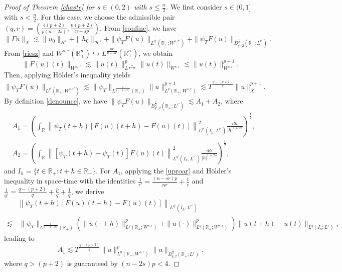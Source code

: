 \documentclass[preprint,compress,12pt]{elsarticle}
\numberwithin{equation}{section}
\begin{document}
\begin{proof}[Proof of Theorem \ref{chaste} for $s\in(0,2)$ with $s\leq \frac{n}{2}$]
	We first consider $s\in(0,1]$ with $s<\frac{n}{2}$. For this case, we choose the admissible pair
	$(q,r)=\left(\frac{4(p+2)}{p(n-2s)},\frac{n(p+2)}{n+sp}\right)$. From \eqref{confine}, we have
	\begin{equation}\label{orr}
		\|\Gamma u\|_{X}\lesssim \|u_{0}\|_{H^{s}}+\|h_{0}\|_{\mathcal{H}^{s}}+\|\psi_{T}F(u)\|_{L^{q'}(\mathbb{R}_{+};W^{s,r'})}+\|\psi_{T}F(u)\|_{B^{\frac{s}{2}}_{q',2}(\mathbb{R}_{+};L^{r'})}.
	\end{equation}
	From \eqref{riesz} and $W^{s,r}(\mathbb{R}_{+}^{n})\hookrightarrow L^{\frac{nr}{n-sr}}(\mathbb{R}_{+}^{n})$, we obtain
	\begin{equation*}
		\|F(u)(t)\|_{W^{s,r'}}\lesssim \|u(t)\|_{L^{\frac{nr}{n-sr}}}^{p} \|u(t)\|_{W^{s,r}}\lesssim  \|u(t)\|_{W^{s,r}}^{p+1}.
	\end{equation*}
	Then, applying H\"{o}lder's inequality yields
	\begin{equation}\label{bigf}
		\|\psi_{T} F(u)\|_{L^{q'}(\mathbb{R}_{+};W^{s,r'})}\lesssim\|\psi_{T}\|_{L^{\frac{q}{q-(p+2)}}(\mathbb{R}_{+})}  \|u\|_{L^{q}(\mathbb{R}_{+};W^{s,r})}^{p+1}\lesssim T^{\frac{q-(p+2)}{q}} \|u\|_{X}^{p+1}.
	\end{equation}
	By definition \eqref{denounce}, we have $\|\psi_{T}F(u)\|_{\dot{B}^{\frac{s}{2}}_{q',2}(\mathbb{R}_{+};L^{r'})}\lesssim A_{1}+A_{2}$, where
	\begin{align}
		&A_{1}=\left(\int_{\mathbb{R}} \left\|\psi_{T}(t+h)\left[ F(u)(t+h)-F(u)(t)\right]\right\|_{L^{q'}(I_{h};L^{r'})}^{2}  \frac { dh}{{|h|^{1+2s}}}\right)^{\frac{1}{2}},\label{a11}\\
		&A_{2}=\left(\int_{\mathbb{R}}  \left\| \left[\psi_{T}(t+h)-\psi_{T}(t) \right] F(u)(t)\right\|_{L^{q'}(I_{h};L^{r'})}^{2} \frac{dh}{|h|^{1+2s}}\right)^{\frac{1}{2}},\label{a2}
	\end{align}
	and $I_{h}=\{t\in\mathbb{R}_{+}: t+h\in\mathbb{R}_{+}\}$. For $A_{1}$, applying the \eqref{uproar} and  H\"{o}lder's
	inequality in space-time with the identities $\frac{1}{r'}=\frac{(n-sr)p}{nr}+\frac{1}{r}$ and $\frac{1}{q'}=\frac{q-(p+2)}{q}+\frac{p}{q}+\frac{1}{q}$, we derive
	\begin{equation*}
		\begin{aligned}
			&\left\|\psi_{T}(t+h)\left[ F(u)(t+h)-F(u)(t)\right]\right\|_{L^{q'}(I_{h};L^{r'})}\\
			\lesssim&\,
			\|\psi_{T}\|_{L^{\frac{q}{q-(p+2)}}(\mathbb{R}_+)}  \left(\|u(\cdot+h)\|_{L^{q}(\mathbb{R}_{+};W^{s,r})}^{p}+ \|u(\cdot)\| ^{p}_{L^{q}(\mathbb{R}_{+};W^{s,r})}\right) \|u(t+h)-u(t)\|_{L^{q}(I_{h};L^{r})},
		\end{aligned}
	\end{equation*}
	leading to
	\begin{equation}\label{a1}
		A_{1}\lesssim  T^{\frac{q-(p+2)}{q}} \|u\|_{L^{q}(\mathbb{R}_{+};W^{s,r})}^{p}\|u\|_{\dot{B}^{\frac{s}{2}}_{q,2}(\mathbb{R}_{+};L^{r})}.
	\end{equation}
	where $q >(p+2)$ is guaranteed by $(n-2s)p<4$.
	

\end{proof}
\end{document}
